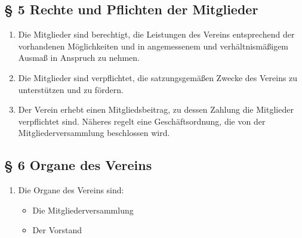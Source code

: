 \documentclass[10pt,a4paper]{scrartcl}
\begin{document}
\subsection*{§ 5 Rechte und Pflichten der Mitglieder}
\begin{enumerate}
	\item Die Mitglieder sind berechtigt, die Leistungen des Vereins entsprechend der vorhandenen
		Möglichkeiten und in angemessenem und verhältnismäßigem Ausmaß in Anspruch zu nehmen.
	\item Die Mitglieder sind verpflichtet, die satzungsgemäßen Zwecke des Vereins zu unterstützen
		und zu fördern.
	\item Der Verein erhebt einen Mitgliedsbeitrag, zu dessen Zahlung die Mitglieder verpflichtet
		sind. Näheres regelt eine Geschäftsordnung, die von der Mitgliederversammlung beschlossen
		wird.
\end{enumerate}
\subsection*{§ 6 Organe des Vereins }
\begin{enumerate}
	\item Die Organe des Vereins sind:
		\begin{itemize}
			\item Die Mitgliederversammlung
			\item Der Vorstand
		\end{itemize}
\end{enumerate}
\end{document}
